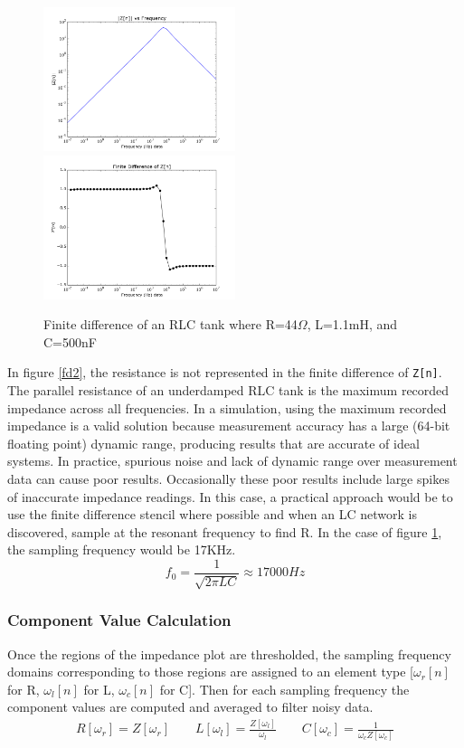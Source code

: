 \documentclass[11pt,twoside]{mitthesis}
\begin{document}
\begin{figure}[H]
\includegraphics[width=0.5\textwidth]{../fd2.png}
\includegraphics[width=0.5\textwidth]{../fd1.png}
\caption{Finite difference of an RLC tank where R=44$\Omega$, L=1.1mH, and C=500nF}
\label{fig:fd2}
\end{figure}

In figure \ref{fd2}, the resistance is not represented in the finite difference of \texttt{Z[n]}.
The parallel resistance of an underdamped RLC tank is the maximum recorded impedance across all frequencies.
In a simulation, using the maximum recorded impedance is a valid solution because measurement accuracy has a large (64-bit floating point) dynamic range, producing results that are accurate of ideal systems.
In practice, spurious noise and lack of dynamic range over measurement data can cause poor results.
Occasionally these poor results include large spikes of inaccurate impedance readings.
In this case, a practical approach would be to use the finite difference stencil where possible and when an LC network is discovered, sample at the resonant frequency to find R. 
In the case of figure \ref{fig:fd2}, the sampling frequency would be 17KHz.
\begin{equation*}
f_{0} = \frac{1}{\sqrt{2\pi L C}} \approx 17000 Hz
\end{equation*}

\subsubsection{Component Value Calculation}
Once the regions of the impedance plot are thresholded, the sampling frequency domains corresponding to those regions are assigned to an element type [$\omega_r[n]$ for R, $\omega_l[n]$ for L, $\omega_c[n]$ for C].
Then for each sampling frequency the component values are computed and averaged to filter noisy data.
\begin{align*}
R[\omega_r] = Z[\omega_r] \qquad
L[\omega_l] = \frac{Z[\omega_l]}{\omega_l} \qquad
C[\omega_c] = \frac{1}{\omega_c Z[\omega_c]}  
\end{align*}
\end{document}
